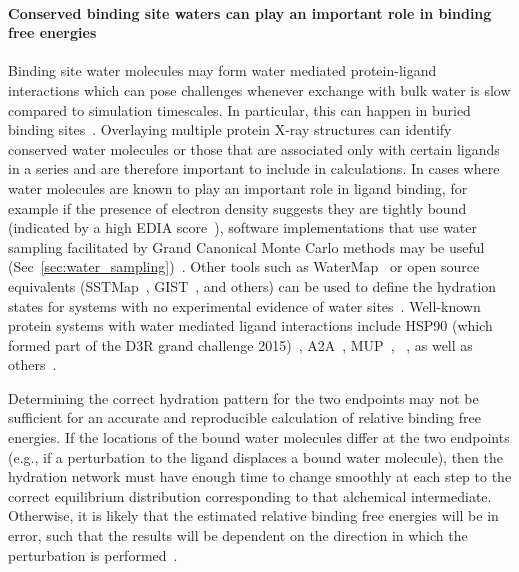 \documentclass[9pt,bestpractices]{livecoms}
\begin{document}
\paragraph{Conserved binding site waters can play an important role in binding free energies}
Binding site water molecules may form water mediated protein-ligand interactions which can pose challenges whenever exchange with bulk water is slow compared to simulation timescales. In particular, this can happen in buried binding sites~\cite{laage2017water}. Overlaying multiple protein X-ray structures can identify conserved water molecules or those that are associated only with certain ligands in a series and are therefore important to include in calculations. In cases where water molecules are known to play an important role in ligand binding, for example if the presence of electron density suggests they are tightly bound (indicated by a high EDIA score~\cite{nittinger2015evidence,meyder2017estimating}), software implementations that use water sampling facilitated by Grand Canonical Monte Carlo methods may be useful  (Sec~\ref{sec:water_sampling})~\cite{michel2010prediction}. Other tools such as WaterMap~\cite{abel2008role,young2007motifs} or open source equivalents (SSTMap~\cite{haider2018solvation}, GIST~\cite{ramsey2016solvation}, and others) can be used to define the hydration states for systems with no experimental evidence of water sites~\cite{wang2011ligand}. Well-known protein systems with water mediated ligand interactions include HSP90 (which formed part of the D3R grand challenge 2015)~\cite{mey2016blinded}, A2A~\cite{brucemacdonald2018ligand}, MUP~\cite{ross2015water}, ~\cite{deflorian2020accurate}, as well as others~\cite{michel2009energetics}.

Determining the correct hydration pattern for the two endpoints may not be sufficient for an accurate and reproducible calculation of relative binding free energies. If the locations of the bound water molecules differ at the two endpoints (e.g., if a perturbation to the ligand displaces a bound water molecule), then the hydration network must have enough time to change smoothly at each step to the correct equilibrium distribution corresponding to that alchemical intermediate.  Otherwise, it is likely that the estimated relative binding free energies will be in error, such that the results will be dependent on the direction in which the perturbation is performed~\cite{ross2020enhancing}.
\end{document}
